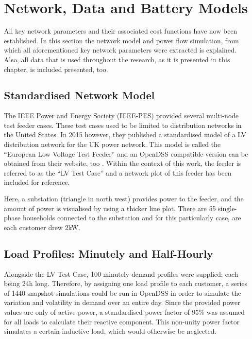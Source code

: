 \section{Network, Data and Battery Models}
\label{ch1:sec:data-and-network-models}

All key network parameters and their associated cost functions have now been established.
In this section the network model and power flow simulation, from which all aforementioned key network parameters were extracted is explained.
Also, all data that is used throughout the research, as it is presented in this chapter, is included presented, too.

\subsection{Standardised Network Model}
\label{ch1:subsec:standardised-network-model}

The IEEE Power and Energy Society (IEEE-PES) provided several multi-node test feeder cases.
These test cases used to be limited to distribution networks in the United States.
In 2015 however, they published a standardised model of a LV distribution network for the UK power network.
This model is called the ``European Low Voltage Test Feeder'' and an OpenDSS compatible version can be obtained from their website, too \cite{DistributionTestFeeders2017}.
Within the context of this work, the feeder is referred to as the ``LV Test Case'' and a network plot of this feeder has been included for reference.



Here, a substation (triangle in north west) provides power to the feeder, and the amount of power is visualised by using a thicker line plot.
There are 55 single-phase households connected to the substation and for this particularly case, are each customer drew 2kW.

\subsection{Load Profiles: Minutely and Half-Hourly}

Alongside the LV Test Case, 100 minutely demand profiles were supplied; each being 24h long.
Therefore, by assigning one load profile to each customer, a series of 1440 snapshot simulations could be run in OpenDSS in order to simulate the variation and volatility in demand over an entire day.
Since the provided power values are only of active power, a standardised power factor of 95\% was assumed for all loads to calculate their reactive component.
This non-unity power factor simulates a certain inductive load, which would otherwise be neglected.

